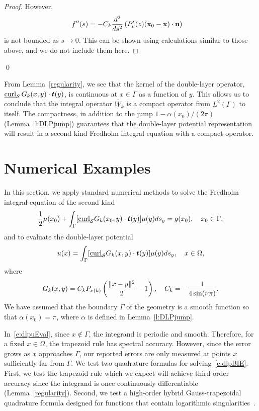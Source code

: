 \begin{proof}
However,
\begin{align*} 
  f''(s) &= -C_k \frac{d^2}{ds^2}\left( P'_\nu(z) 
  (\mathbf{x}_{0}-\mathbf{x}) \cdot \mathbf{n} \right)
\end{align*}
is not bounded as $s\rightarrow 0$. This can be shown using calculations
similar to those above, and we do not include them here.
\end{proof}
\qed

From Lemma~\ref{regularity}, we see that the kernel of the double-layer
operator, $\underline{\mbox{curl}}_{\S}\, G_{k}(x,y)\cdot\vec{t}(y)$, is
continuous at $x \in \Gamma$ as a function of $y$.  This allows us to
conclude that the integral operator $\widetilde{W_k}$ is a compact
operator from $L^{2}(\Gamma)$ to itself.  The compactness, in addition
to the jump $1-\alpha(x_0)/(2\pi)$ (Lemma~\ref{l:DLPjump}) guarantees
that the double-layer potential representation will result in a second
kind Fredholm integral equation with a compact operator.

\section{Numerical Examples}
\label{s:numerics}
In this section, we apply standard numerical methods to solve the
Fredholm integral equation of the second kind
\begin{align}
  \label{e:dlpBIE}
  \frac{1}{2}\mu(x_{0}) + \int_{\Gamma}
    [\underline{\mbox{curl}}_{\S}G_{k}(x_{0},y) \cdot
    \vec{t}(y)] \mu(y)ds_{y} = g(x_{0}), \quad x_{0} \in \Gamma,
\end{align}
and to evaluate the double-layer potential
\begin{align}
  \label{e:dlpuEval}
  u(x) = \int_{\Gamma} [\underline{\mbox{curl}}_{\S}G_{k}(x,y) 
    \cdot \vec{t}(y)] \mu(y)ds_{y}, \quad x \in \Omega,
\end{align}
where
\begin{align*}
  G_{k}(x,y) = C_k P_{\nu(k)} \left(
    \frac{\|x - y\|^{2}}{2} - 1\right), \quad 
  C_k=-\frac{1}{4\sin(\nu\pi)}.
\end{align*}
We have assumed that the boundary $\Gamma$ of the geometry is a smooth
function so that $\alpha(x_{0}) = \pi$, where $\alpha$ is defined in
Lemma~\ref{l:DLPjump}.

In~\eqref{e:dlpuEval}, since $x \notin \Gamma$, the integrand is
periodic and smooth.  Therefore, for a fixed $x\in \Omega$, the
trapezoid rule has spectral accuracy.  However, since the error grows as
$x$ approaches $\Gamma$, our reported errors are only measured at points
$x$ sufficiently far from $\Gamma$.  We test two quadrature formulas for
solving~\eqref{e:dlpBIE}.  First, we test the trapezoid rule which we
expect will achieve third-order accuracy since the integrand is once
continuously differentiable (Lemma~\ref{regularity}).  Second, we test a
high-order hybrid Gauss-trapezoidal quadrature formula designed for
functions that contain logarithmic singularities~\cite{alpert}.

